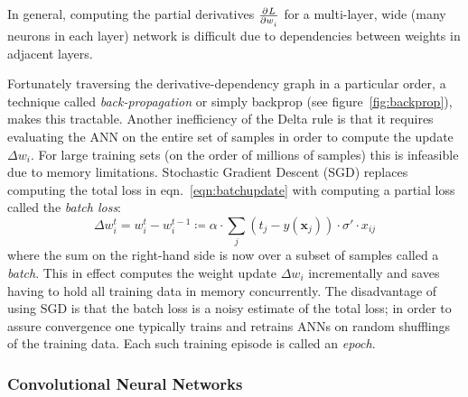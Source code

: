 In general, computing the partial derivatives \(\pd{L}{w_i}\) for a multi-layer, wide (many neurons in each layer) network is difficult due to dependencies between weights in adjacent layers.
%

Fortunately traversing the derivative-dependency graph in a particular order, a technique called \textit{back-propagation} or simply backprop (see figure~\ref{fig:backprop}), makes this tractable.
%
Another inefficiency of the Delta rule is that it requires evaluating the ANN on the entire set of samples in order to compute the update \(\Delta w_i\).
%
For large training sets (on the order of millions of samples) this is infeasible due to memory limitations.
%
Stochastic Gradient Descent (SGD) replaces computing the total loss in eqn.~\eqref{eqn:batchupdate} with computing a partial loss called the \textit{batch loss}:
\begin{equation}
    \Delta w_i^t = w_i^t - w_i^{t-1} \coloneqq \alpha \cdot \sum_j (t_j-y(\mathbf{x}_j))\cdot \sigma'\cdot x_{ij}
    \label{eqn:sgd}
\end{equation}
where the sum on the right-hand side is now over a subset of samples called a \textit{batch}.
%
This in effect computes the weight update \(\Delta w_i\) incrementally and saves having to hold all training data in memory concurrently.
%
The disadvantage of using SGD is that the batch loss is a noisy estimate of the total loss; in order to assure convergence one typically trains and retrains ANNs on random shufflings of the training data.
%
Each such training episode is called an \textit{epoch}.
%





\subsubsection{Convolutional Neural Networks}




